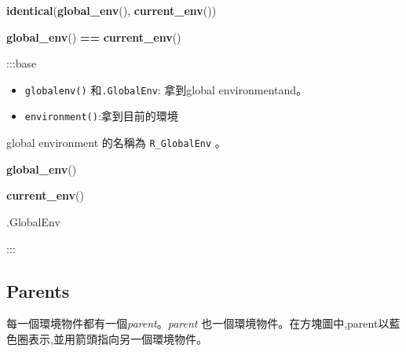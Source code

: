 \documentclass[]{book}
\newenvironment{Shaded}{\begin{snugshade}}{\end{snugshade}}
\newcommand{\KeywordTok}[1]{\textcolor[rgb]{0.13,0.29,0.53}{\textbf{#1}}}
\newcommand{\StringTok}[1]{\textcolor[rgb]{0.31,0.60,0.02}{#1}}
\newcommand{\OperatorTok}[1]{\textcolor[rgb]{0.81,0.36,0.00}{\textbf{#1}}}
\newcommand{\NormalTok}[1]{#1}
\providecommand{\tightlist}{%
  \setlength{\itemsep}{0pt}\setlength{\parskip}{0pt}}
\theoremstyle{definition}
\theoremstyle{definition}
\theoremstyle{definition}
\theoremstyle{remark}
\begin{document}
\begin{Shaded}
\begin{Highlighting}[]
\KeywordTok{identical}\NormalTok{(}\KeywordTok{global_env}\NormalTok{(), }\KeywordTok{current_env}\NormalTok{())}
\end{Highlighting}
\end{Shaded}

\begin{Shaded}
\begin{Highlighting}[]
\KeywordTok{global_env}\NormalTok{() }\OperatorTok{==}\StringTok{ }\KeywordTok{current_env}\NormalTok{()}
\end{Highlighting}
\end{Shaded}

:::base

\begin{itemize}
\tightlist
\item
  \texttt{globalenv()} 和\texttt{.GlobalEnv}: 拿到global
  environmentand。
\item
  \texttt{environment()}:拿到目前的環境
\end{itemize}

global environment 的名稱為 \texttt{R\_GlobalEnv} 。

\begin{Shaded}
\begin{Highlighting}[]
\KeywordTok{global_env}\NormalTok{()}
\end{Highlighting}
\end{Shaded}

\begin{Shaded}
\begin{Highlighting}[]
\KeywordTok{current_env}\NormalTok{()}
\end{Highlighting}
\end{Shaded}

\begin{Shaded}
\begin{Highlighting}[]
\NormalTok{.GlobalEnv}
\end{Highlighting}
\end{Shaded}

:::

\subsection{Parents}\label{parents}

每一個環境物件都有一個\emph{parent}。\emph{parent}
也一個環境物件。在方塊圖中,parent以藍色圈表示,並用箭頭指向另一個環境物件。
\end{document}
